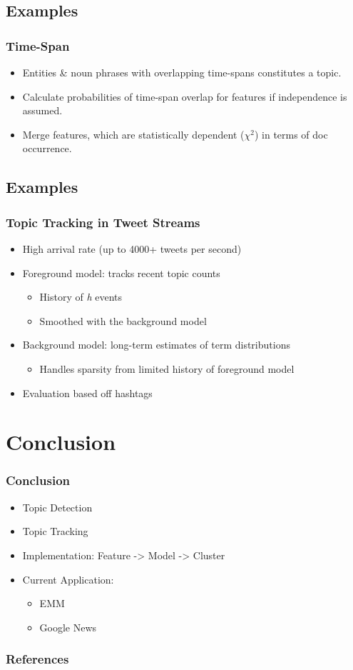 \documentclass{beamer}
\begin{document}
\subsection{Examples}
\begin{frame}
	\frametitle{Time-Span \citep{Swan:1999:EST:319950.319956}}
	\begin{itemize}
		\item Entities \& noun phrases with overlapping time-spans constitutes a topic.
		\item Calculate probabilities of time-span overlap for features if independence is assumed.
		\item Merge features, which are statistically dependent ($\chi^2$) in terms of doc occurrence.
	\end{itemize}
\end{frame}

\subsection{Examples}
\begin{frame}
	\frametitle{Topic Tracking in Tweet Streams \citep{Lin:2011:STA:2020408.2020476}}
	\begin{itemize}
		\item High arrival rate (up to 4000+ tweets per second)
		\item Foreground model: tracks recent topic counts
			\begin{itemize}
				\item History of \emph{h} events
				\item Smoothed with the background model
			\end{itemize}
		\item Background model: long-term estimates of term distributions
			\begin{itemize}
				\item Handles sparsity from limited history of foreground model
			\end{itemize}
		\item Evaluation based off hashtags
	\end{itemize}
\end{frame}

\section{Conclusion}
\begin{frame}
	\frametitle{Conclusion}
	\begin{itemize}
		\item Topic Detection
		\item Topic Tracking
		\item Implementation: Feature -> Model -> Cluster
		\item Current Application:
			\begin{itemize}
				\item EMM
				\item Google News
			\end{itemize}
	\end{itemize}
\end{frame}

\begin{frame}
\frametitle{References}


\end{frame}
\end{document}
